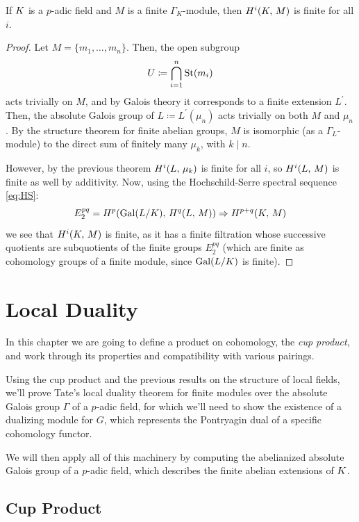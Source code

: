 \documentclass[a4paper, oneside]{memoir}
\begin{document}
\begin{corollary}\label{cor:FinCohom}
    If $K$ is a $p$-adic field and $M$ is a finite $\Gamma_K$-module, then
    \(H^{i}( K, \, M )\) is finite for all $i$.
\end{corollary}
\begin{proof}
    Let $M=\{m_1,\ldots,m_n\}$. Then, the open subgroup
    \[
        U\coloneqq \bigcap_{i=1}^n{\operatorname{\mathrm{St}}(m_i)}
    \]
    acts trivially on $M$, and by Galois theory it corresponds to a finite extension $L^{\prime} $. Then, the absolute Galois group of $L\coloneqq L^{\prime}(\mu_n)$ acts trivially on both $M$ and $\mu_n$. By the structure theorem for finite abelian groups, $M$ is isomorphic (as a $\Gamma_L$-module) to the direct sum of finitely many $\mu_k$, with $k\mid n$.

    However, by the previous theorem $H^{i}( L, \, \mu_k )$ is finite for all $i$, so $H^{i}( L, \, M )$ is finite as well by additivity. Now, using the Hochschild-Serre spectral sequence \eqref{eq:HS}:
    \[
        E_2^{pq}= H^{p}( \mathrm{Gal}{(L / K)}, \, H^{q}( L, \, M ) ) \Rightarrow H^{p+q}( K, \, M )
    \]
    we see that $H^{i}( K, \, M )$ is finite, as it has a finite filtration whose successive quotients are subquotients of the finite groups $E_2^{pq}$ (which are finite as cohomology groups of a finite module, since $\mathrm{Gal}(L /K)$ is finite).
\end{proof}




\chapter{Local Duality}
In this chapter we are going to define a product on cohomology, the \textit{cup product}, and work through its properties and compatibility with various pairings.

Using the cup product and the previous results on the structure of local fields, we'll prove Tate's local duality theorem for finite modules over the absolute Galois group $\Gamma$ of a $p$-adic field, for which we'll need to show the existence of a dualizing module for $G$, which represents the Pontryagin dual of a specific cohomology functor.

We will then apply all of this machinery by computing the abelianized absolute Galois group of a $p$-adic field, which describes the finite abelian extensions of $K$.

\section{Cup Product}
\end{document}
